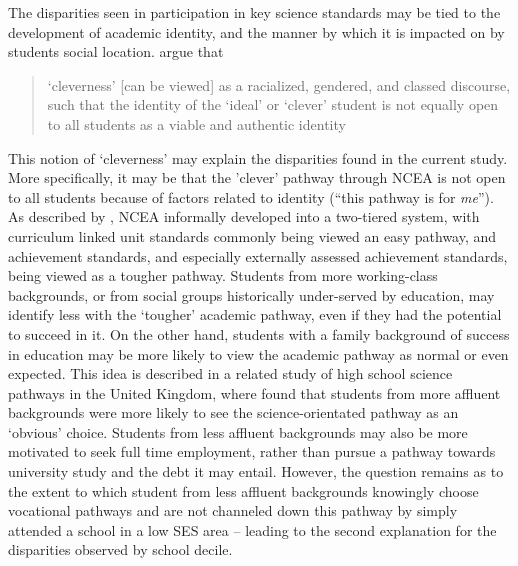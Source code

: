 The disparities seen in participation in key science standards may be tied to the development of academic identity, and the manner by which it is impacted on by students social location. \citep[p.216]{Archer2014} argue that \blockquote{`cleverness' [can be viewed] as a racialized, gendered, and classed discourse, such that the identity of the `ideal' or `clever' student is not equally open to all students as a viable and authentic identity} This notion of `cleverness' may explain the disparities found in the current study. More specifically, it may be that the 'clever' pathway through NCEA is not open to all students because of factors related to identity (``this pathway is for \textit{me}''). As described by \citet{hipkins2016ncea}, NCEA informally developed into a two-tiered system, with curriculum linked unit standards commonly being viewed an easy pathway, and achievement standards, and especially externally assessed achievement standards, being viewed as a tougher pathway. Students from more working-class backgrounds, or from social groups historically under-served by education, may identify less with the `tougher' academic pathway, even if they had the potential to succeed in it. On the other hand, students with a family background of success in education may be more likely to view the academic pathway as normal or even expected. This idea is described in a related study of high school science pathways in the United Kingdom, where \citet{archer2017stratifying} found that students from more affluent backgrounds were more likely to see the science-orientated pathway as an `obvious' choice. Students from less affluent backgrounds may also be more motivated to seek full time employment, rather than pursue a pathway towards university study and the debt it may entail. However, the question remains as to the extent to which student from less affluent backgrounds knowingly choose vocational pathways and are not channeled down this pathway by simply attended a school in a low SES area -- leading to the second explanation for the disparities observed by school decile.  


